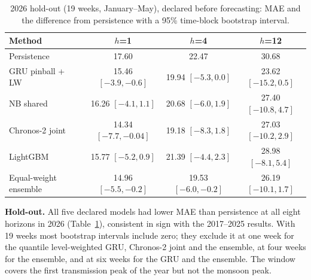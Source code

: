 \begin{table}[t]
\centering
\caption{2026 hold-out (19 weeks, January--May), declared before forecasting: MAE and the difference from persistence with a 95\% time-block bootstrap interval.}
\label{tab:holdout}
\small
\setlength{\tabcolsep}{2.5pt}
\begin{tabular}{lccc}
\toprule
\textbf{Method} & $h$=1 & $h$=4 & $h$=12 \\
\midrule
Persistence & 17.60 & 22.47 & 30.68 \\
GRU pinball + LW & 15.46 {\scriptsize$[-3.9,-0.6]$} & 19.94 {\scriptsize$[-5.3,0.0]$} & 23.62 {\scriptsize$[-15.2,0.5]$} \\
NB shared & 16.26 {\scriptsize$[-4.1,1.1]$} & 20.68 {\scriptsize$[-6.0,1.9]$} & 27.40 {\scriptsize$[-10.8,4.7]$} \\
Chronos-2 joint & 14.34 {\scriptsize$[-7.7,-0.04]$} & 19.18 {\scriptsize$[-8.3,1.8]$} & 27.03 {\scriptsize$[-10.2,2.9]$} \\
LightGBM & 15.77 {\scriptsize$[-5.2,0.9]$} & 21.39 {\scriptsize$[-4.4,2.3]$} & 28.98 {\scriptsize$[-8.1,5.4]$} \\
Equal-weight ensemble & 14.96 {\scriptsize$[-5.5,-0.2]$} & 19.53 {\scriptsize$[-6.0,-0.2]$} & 26.19 {\scriptsize$[-10.1,1.7]$} \\
\bottomrule
\end{tabular}
\end{table}

\textbf{Hold-out.} All five declared models had lower MAE than persistence at all eight horizons in 2026 (Table~\ref{tab:holdout}), consistent in sign with the 2017--2025 results. With 19 weeks most bootstrap intervals include zero; they exclude it at one week for the quantile level-weighted GRU, Chronos-2 joint and the ensemble, at four weeks for the ensemble, and at six weeks for the GRU and the ensemble. The window covers the first transmission peak of the year but not the monsoon peak.

